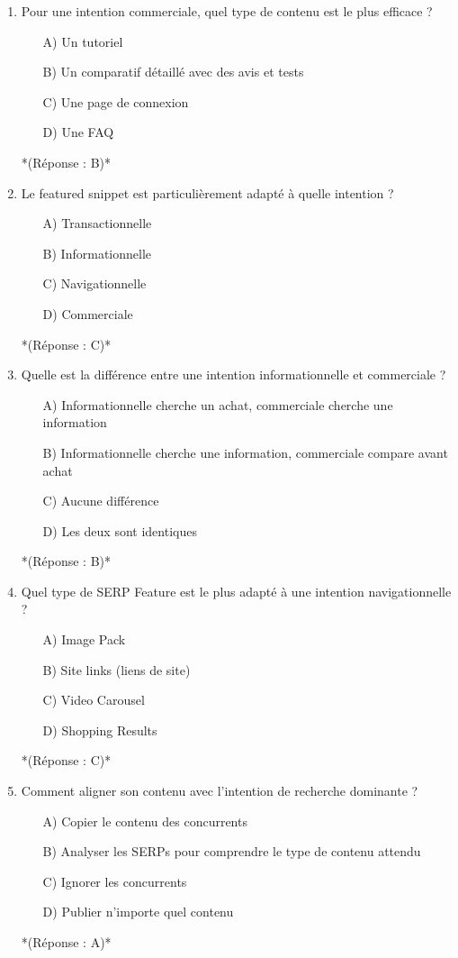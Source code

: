 \documentclass[12pt,a4paper,twoside]{report}
\begin{document}
\begin{enumerate}
\item Pour une intention commerciale, quel type de contenu est le plus efficace ?
\begin{itemize}
\item[A)] Un tutoriel
\item[B)] Un comparatif détaillé avec des avis et tests
\item[C)] Une page de connexion
\item[D)] Une FAQ
\end{itemize}
*(Réponse : B)*

\item Le featured snippet est particulièrement adapté à quelle intention ?
\begin{itemize}
\item[A)] Transactionnelle
\item[B)] Informationnelle
\item[C)] Navigationnelle
\item[D)] Commerciale
\end{itemize}
*(Réponse : C)*

\item Quelle est la différence entre une intention informationnelle et commerciale ?
\begin{itemize}
\item[A)] Informationnelle cherche un achat, commerciale cherche une information
\item[B)] Informationnelle cherche une information, commerciale compare avant achat
\item[C)] Aucune différence
\item[D)] Les deux sont identiques
\end{itemize}
*(Réponse : B)*

\item Quel type de SERP Feature est le plus adapté à une intention navigationnelle ?
\begin{itemize}
\item[A)] Image Pack
\item[B)] Site links (liens de site)
\item[C)] Video Carousel
\item[D)] Shopping Results
\end{itemize}
*(Réponse : C)*

\item Comment aligner son contenu avec l'intention de recherche dominante ?
\begin{itemize}
\item[A)] Copier le contenu des concurrents
\item[B)] Analyser les SERPs pour comprendre le type de contenu attendu
\item[C)] Ignorer les concurrents
\item[D)] Publier n'importe quel contenu
\end{itemize}
*(Réponse : A)*


\end{enumerate}
\end{document}
